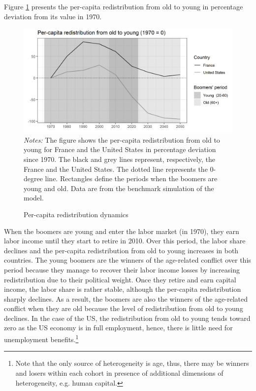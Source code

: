 Figure \ref{chap1-fig:discuss-ratiopc} presents the per-capita redistribution from old to young in percentage deviation from its value in 1970.
\begin{figure}[!tb]
	\centering
	\caption{Per-capita redistribution dynamics} \label{chap1-fig:discuss-ratiopc}
	\includegraphics[width=1\linewidth]{chap1/graphic/discuss-ratiopc.png}
	\vspace{-3em}
	\justify\singlespacing\footnotesize\textit{Notes:} The figure shows the per-capita redistribution from old to young for France and the United States in percentage deviation since 1970. The black and grey lines represent, respectively, the France and the United States. The dotted line represents the 0-degree line. Rectangles define the periods when the boomers are young and old. Data are from the benchmark simulation of the model.
\end{figure}
When the boomers are young and enter the labor market (in 1970), they earn labor income until they start to retire in 2010. Over this period, the labor share declines and the per-capita redistribution from old to young increases in both countries. The young boomers are the winners of the age-related conflict over this period because they manage to recover their labor income losses by increasing redistribution due to their political weight. Once they retire and earn capital income, the labor share is rather stable, although the per-capita redistribution sharply declines. As a result, the boomers are also the winners of the age-related conflict when they are old because the level of redistribution from old to young declines. In the case of the US, the redistribution from old to young tends toward zero as the US economy is in full employment, hence, there is little need for unemployment benefits.\footnote{Note that the only source of heterogeneity is age, thus, there may be winners and losers within each cohort in presence of additional dimensions of heterogeneity, e.g. human capital.}